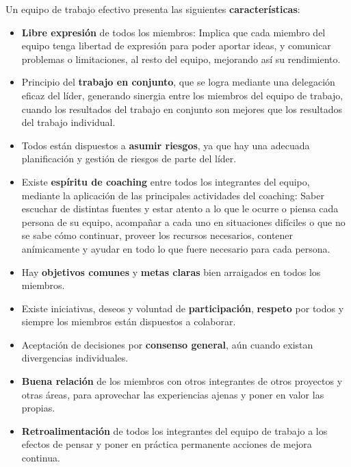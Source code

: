 Un equipo de trabajo efectivo presenta las siguientes \textbf{características}:

\begin{itemize}
    \item \textbf{Libre expresión} de todos los miembros: Implica que cada miembro del equipo tenga libertad de expresión para poder aportar ideas, y comunicar problemas o limitaciones, al resto del equipo, mejorando así su rendimiento.
    
    \item Principio del \textbf{trabajo en conjunto}, que se logra mediante una delegación eficaz del líder, generando sinergia entre los miembros del equipo de trabajo, cuando los resultados del trabajo en conjunto son mejores que los resultados del trabajo individual.
    
    \item Todos están dispuestos a \textbf{asumir riesgos}, ya que hay una adecuada planificación y gestión de riesgos de parte del líder.
    
    \item Existe \textbf{espíritu de coaching} entre todos los integrantes del equipo, mediante la aplicación de las principales actividades del coaching: Saber escuchar de distintas fuentes y estar atento a lo que le ocurre o piensa cada persona de su equipo, acompañar a cada uno en situaciones difíciles o que no se sabe cómo continuar, proveer los recursos necesarios, contener anímicamente y ayudar en todo lo que fuere necesario para cada persona.

    \item Hay \textbf{objetivos comunes} y \textbf{metas claras} bien arraigados en todos los miembros.
    
    \item Existe iniciativas, deseos y voluntad de \textbf{participación}, \textbf{respeto} por todos y siempre los miembros están dispuestos a colaborar.
    
    \item Aceptación de decisiones por \textbf{consenso general}, aún cuando existan divergencias individuales.
    
    \item \textbf{Buena relación} de los miembros con otros integrantes de otros proyectos y otras áreas, para aprovechar las experiencias ajenas y poner en valor las propias.
    
    \item \textbf{Retroalimentación} de todos los integrantes del equipo de trabajo a los efectos de pensar y poner en práctica permanente acciones de mejora continua.
\end{itemize}


